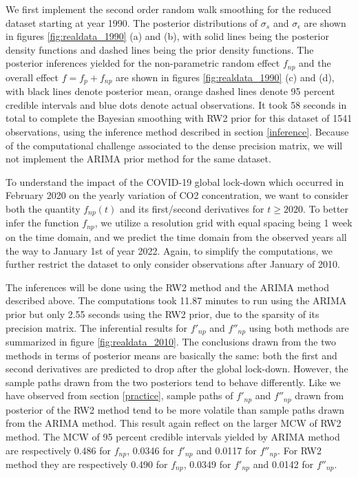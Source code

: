 \documentclass{article}
\begin{document}
We first implement the second order random walk smoothing for the reduced dataset starting at year 1990. The posterior distributions of $\sigma_s$ and $\sigma_\epsilon$ are shown in figures \ref{fig:realdata_1990} (a) and (b), with solid lines being the posterior density functions and dashed lines being the prior density functions. The posterior inferences yielded for the non-parametric random effect $f_{np}$ and the overall effect $f = f_p + f_{np}$ are shown in figures \ref{fig:realdata_1990} (c) and (d), with black lines denote posterior mean, orange dashed lines denote 95 percent credible intervals and blue dots denote actual observations. It took 58 seconds in total to complete the Bayesian smoothing with RW2 prior for this dataset of 1541 observations, using the inference method described in section \ref{inference}. Because of the computational challenge associated to the dense precision matrix, we will not implement the ARIMA prior method for the same dataset.


To understand the impact of the COVID-19 global lock-down which occurred in February 2020 on the yearly variation of CO2 concentration, we want to consider both the quantity $f_{np}(t)$ and its first/second derivatives for $t \geq 2020$. To better infer the function $f_{np}$, we utilize a resolution grid with equal spacing being 1 week on the time domain, and we predict the time domain from the observed years all the way to January 1st of year 2022. Again, to simplify the computations, we further restrict the dataset to only consider observations after January of 2010.


The inferences will be done using the RW2 method and the ARIMA method described above. The computations took 11.87 minutes to run using the ARIMA prior but only 2.55 seconds using the RW2 prior, due to the sparsity of its precision matrix. The inferential results for $f'_{np}$ and $f''_{np}$ using both methods are summarized in figure \ref{fig:realdata_2010}. The conclusions drawn from the two methods in terms of posterior means are basically the same: both the first and second derivatives are predicted to drop after the global lock-down. However, the sample paths drawn from the two posteriors tend to behave differently. Like we have observed from section \ref{practice}, sample paths of $f'_{np}$ and $f''_{np}$ drawn from posterior of the RW2 method tend to be more volatile than sample paths drawn from the ARIMA method. This result again reflect on the larger MCW of RW2 method. The MCW of 95 percent credible intervals yielded by ARIMA method are respectively 0.486 for $f_{np}$, 0.0346 for $f'_{np}$ and 0.0117 for $f''_{np}$. For RW2 method they are respectively 0.490 for $f_{np}$, 0.0349 for $f'_{np}$ and 0.0142 for $f''_{np}$.
\end{document}
